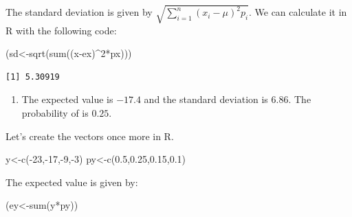 \documentclass[
  letterpaper,
  DIV=11,
  numbers=noendperiod]{scrreprt}
\newenvironment{Shaded}{\begin{snugshade}}{\end{snugshade}}
\newcommand{\DecValTok}[1]{\textcolor[rgb]{0.68,0.00,0.00}{#1}}
\newcommand{\FloatTok}[1]{\textcolor[rgb]{0.68,0.00,0.00}{#1}}
\newcommand{\FunctionTok}[1]{\textcolor[rgb]{0.28,0.35,0.67}{#1}}
\newcommand{\NormalTok}[1]{\textcolor[rgb]{0.00,0.23,0.31}{#1}}
\newcommand{\OtherTok}[1]{\textcolor[rgb]{0.00,0.23,0.31}{#1}}
\newcommand{\SpecialCharTok}[1]{\textcolor[rgb]{0.37,0.37,0.37}{#1}}
\providecommand{\tightlist}{%
  \setlength{\itemsep}{0pt}\setlength{\parskip}{0pt}}\usepackage{longtable,booktabs,array}
\begin{document}
The standard deviation is given by
\(\sqrt{\sum_{i=1}^{n}(x_{i}-\mu)^2p_{i}}\). We can calculate it in R
with the following code:

\begin{Shaded}
\begin{Highlighting}[numbers=left,,]
\NormalTok{(sd}\OtherTok{\textless{}{-}}\FunctionTok{sqrt}\NormalTok{(}\FunctionTok{sum}\NormalTok{((x}\SpecialCharTok{{-}}\NormalTok{ex)}\SpecialCharTok{\^{}}\DecValTok{2}\SpecialCharTok{*}\NormalTok{px)))}
\end{Highlighting}
\end{Shaded}

\begin{verbatim}
[1] 5.30919
\end{verbatim}

\begin{blackbox}

\begin{enumerate}
\def\labelenumi{\arabic{enumi}.}
\setcounter{enumi}{1}
\tightlist
\item
  The expected value is \(-17.4\) and the standard deviation is
  \(6.86\). The probability of is \(0.25\).
\end{enumerate}

\end{blackbox}

Let's create the vectors once more in R.

\begin{Shaded}
\begin{Highlighting}[numbers=left,,]
\NormalTok{y}\OtherTok{\textless{}{-}}\FunctionTok{c}\NormalTok{(}\SpecialCharTok{{-}}\DecValTok{23}\NormalTok{,}\SpecialCharTok{{-}}\DecValTok{17}\NormalTok{,}\SpecialCharTok{{-}}\DecValTok{9}\NormalTok{,}\SpecialCharTok{{-}}\DecValTok{3}\NormalTok{)}
\NormalTok{py}\OtherTok{\textless{}{-}}\FunctionTok{c}\NormalTok{(}\FloatTok{0.5}\NormalTok{,}\FloatTok{0.25}\NormalTok{,}\FloatTok{0.15}\NormalTok{,}\FloatTok{0.1}\NormalTok{)}
\end{Highlighting}
\end{Shaded}

The expected value is given by:

\begin{Shaded}
\begin{Highlighting}[numbers=left,,]
\NormalTok{(ey}\OtherTok{\textless{}{-}}\FunctionTok{sum}\NormalTok{(y}\SpecialCharTok{*}\NormalTok{py))}
\end{Highlighting}
\end{Shaded}
\end{document}
